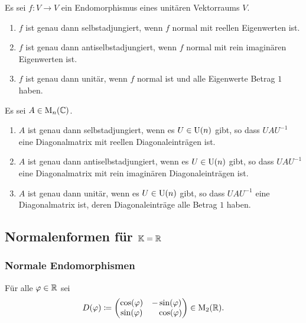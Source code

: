 \begin{proposition}
  Es sei $f \colon V \to V$ ein Endomorphismus eines unitären Vektorraums $V$.
  \begin{enumerate}[leftmargin=*, label=\roman*)]
    \item
      $f$ ist genau dann selbstadjungiert, wenn $f$ normal mit reellen Eigenwerten ist.
    \item
      $f$ ist genau dann antiselbstadjungiert, wenn $f$ normal mit rein imaginären Eigenwerten ist.
    \item
      $f$ ist genau dann unitär, wenn $f$ normal ist und alle Eigenwerte Betrag $1$ haben.
  \end{enumerate}
\end{proposition}


\begin{corollary}
  Es sei $A \in \mathrm{M}_n(\mathbb{C})$.
  \begin{enumerate}[leftmargin=*, label=\roman*)]
    \item
      $A$ ist genau dann selbstadjungiert, wenn es $U \in \mathrm{U}(n)$ gibt, so dass $U\!A U^{-1}$ eine Diagonalmatrix mit reellen Diagonaleinträgen ist.
    \item
      $A$ ist genau dann antiselbstadjungiert, wenn es $U \in \mathrm{U}(n)$ gibt, so dass $U\!A U^{-1}$ eine Diagonalmatrix mit rein imaginären Diagonaleinträgen ist.
    \item
      $A$ ist genau dann unitär, wenn es $U \in \mathrm{U}(n)$ gibt, so dass $U\!A U^{-1}$ eine Diagonalmatrix ist, deren Diagonaleinträge alle Betrag $1$ haben.
  \end{enumerate}
\end{corollary}










\subsection{Normalenformen für \texorpdfstring{$\mathbb{K} = \mathbb{R}$}{K = R}}


\subsubsection{Normale Endomorphismen}


\begin{notation}
  Für alle $\varphi \in \mathbb{R}$ sei
  \[
    D(\varphi)
    \coloneqq
    \begin{pmatrix}
      \cos(\varphi) &          - \sin(\varphi)  \\
      \sin(\varphi) & \phantom{-}\cos(\varphi)
    \end{pmatrix}
    \in
    \mathrm{M}_2(\mathbb{R}).
  \]
\end{notation}


